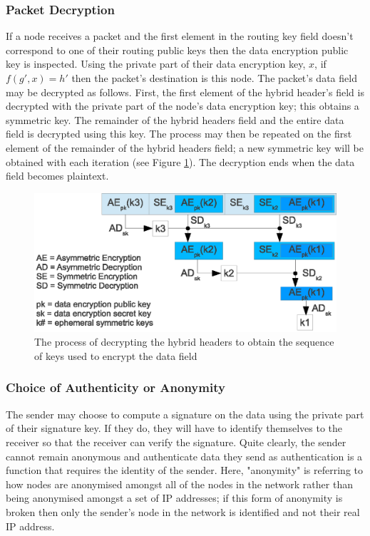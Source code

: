 \documentclass[ %
                    author={Luke Murray},
                supervisor={Dr. Simon Hollis},
                     title={Shadow Peer-to-Peer Networks},
                  subtitle={},
                    degree={MEng},
                      year={2013} ]{thesis}
\begin{document}
\subsubsection{Packet Decryption}

If a node receives a packet and the first element in the routing key field doesn't correspond to one of their routing public keys then the data encryption public key is inspected. Using the private part of their data encryption key, $x$, if $f(g\prime, x) = h\prime$ then the packet's destination is this node. The packet's data field may be decrypted as follows. First, the first element of the hybrid header's field is decrypted with the private part of the node's data encryption key; this obtains a symmetric key. The remainder of the hybrid headers field and the entire data field is decrypted using this key. The process may then be repeated on the first element of the remainder of the hybrid headers field; a new symmetric key will be obtained with each iteration (see Figure \ref{hybrid_decrypt}). The decryption ends when the data field becomes plaintext.

\begin{figure}[h]
    \centering
    \includegraphics{diagrams/hybrid_header_decryption2.eps}
    \caption{The process of decrypting the hybrid headers to obtain the sequence of keys used to encrypt the data field}
    \label{hybrid_decrypt}
\end{figure}

\subsubsection{Choice of Authenticity or Anonymity}

The sender may choose to compute a signature on the data using the private part of their signature key. If they do, they will have to identify themselves to the receiver so that the receiver can verify the signature. Quite clearly, the sender cannot remain anonymous and authenticate data they send as authentication is a function that requires the identity of the sender. Here, "anonymity" is referring to how nodes are anonymised amongst all of the nodes in the network rather than being anonymised amongst a set of IP addresses; if this form of anonymity is broken then only the sender's node in the network is identified and not their real IP address.
\end{document}
